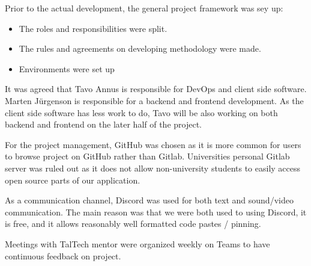 Prior to the actual development, the general project framework was sey up:
\begin{itemize}
    \item The roles and responsibilities were split.
    \item The rules and agreements on developing methodology were made.
    \item Environments were set up
\end{itemize}

It was agreed that Tavo Annus is responsible for DevOps and client side software.
Marten Jürgenson is responsible for a backend and frontend development.
As the client side software has less work to do, Tavo will be also working on both backend and
frontend on the later half of the project.

For the project management, GitHub was chosen as it is more common for users to browse project on GitHub rather than Gitlab.
Universities personal Gitlab server was ruled out as it does not allow non-university students to easily access open source parts of our application.

As a communication channel, Discord was used for both text and sound/video communication.
The main reason was that we were both used to using Discord, it is free, and it allows reasonably well formatted code pastes / pinning.

Meetings with TalTech mentor were organized weekly on Teams to have continuous feedback on project.
